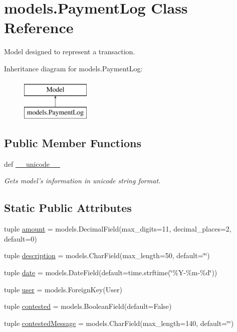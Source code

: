 \hypertarget{classmodels_1_1_payment_log}{\section{models.\-Payment\-Log Class Reference}
\label{classmodels_1_1_payment_log}
}


Model designed to represent a transaction.  


Inheritance diagram for models.\-Payment\-Log\-:\begin{figure}[H]
\begin{center}
\leavevmode
\includegraphics[height=2.000000cm]{classmodels_1_1_payment_log}
\end{center}
\end{figure}
\subsection*{Public Member Functions}
\begin{DoxyCompactItemize}
\item 
def \hyperlink{classmodels_1_1_payment_log_acd2b7422303a0ecade965a291e2a638e}{\-\_\-\-\_\-unicode\-\_\-\-\_\-}
\begin{DoxyCompactList}\small\item\em Gets model's information in unicode string format. \end{DoxyCompactList}\end{DoxyCompactItemize}
\subsection*{Static Public Attributes}
\begin{DoxyCompactItemize}
\item 
tuple \hyperlink{classmodels_1_1_payment_log_a2e40f261b4736e670761066b1de0d081}{amount} = models.\-Decimal\-Field(max\-\_\-digits=11, decimal\-\_\-places=2, default=0)
\item 
tuple \hyperlink{classmodels_1_1_payment_log_ae48129a7de427884354b091e16520e94}{description} = models.\-Char\-Field(max\-\_\-length=50, default=\char`\"{}\char`\"{})
\item 
tuple \hyperlink{classmodels_1_1_payment_log_a52dc6a407079f77462f4be684cf17749}{date} = models.\-Date\-Field(default=time.\-strftime(\char`\"{}\%Y-\/\%m-\/\%d\char`\"{}))
\item 
tuple \hyperlink{classmodels_1_1_payment_log_ac72c158a814c97350349db0a8a091c12}{user} = models.\-Foreign\-Key(User)
\item 
tuple \hyperlink{classmodels_1_1_payment_log_aaeb60280530dfbff5f6f4c17bed6395c}{contested} = models.\-Boolean\-Field(default=False)
\item 
tuple \hyperlink{classmodels_1_1_payment_log_ac1849b45a261444fd1ff697e9e982594}{contested\-Message} = models.\-Char\-Field(max\-\_\-length=140, default=\char`\"{}\char`\"{})
\end{DoxyCompactItemize}


